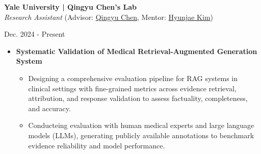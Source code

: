 \documentclass[10pt, letterpaper]{article}
\newenvironment{highlights}{
    \begin{itemize}[
        topsep=0.10 cm,
        parsep=0.10 cm,
        partopsep=0pt,
        itemsep=0pt,
        leftmargin=0 cm + 10pt
    ]
}{
    \end{itemize}
} %
\newenvironment{twocolentry}[2][]{
    \onecolentry
    \def\secondColumn{#2}
    \setcolumnwidth{\fill, 3.5 cm}
    \begin{paracol}{2}
}{
    \switchcolumn \raggedleft \secondColumn
    \end{paracol}
    \endonecolentry
} %
\begin{document}
\vspace{0.1 cm}
        \begin{twocolentry}{
            Dec. 2024 - Present\\ 
        }
        \textbf{Yale University | Qingyu Chen's Lab} \href{https://sites.google.com/view/qingyuchen/home/}{\faExternalLink*}\\
        \textit{Research Assistant} (Advisor: \href{https://scholar.google.com/citations?user=FSLotiMAAAAJ&hl=en}{Qingyu Chen}, Mentor: \href{https://scholar.google.co.kr/citations?user=rqBpumIAAAAJ&hl=ko}{Hyunjae Kim})
        
        \end{twocolentry}
    \vspace{0.1 cm}
\begin{highlights}
    \item \textbf{Systematic Validation of Medical Retrieval-Augmented Generation System}
    \vspace{-0.1 cm}
    \begin{highlights}
        \item Designing a comprehensive evaluation pipeline for RAG systems in clinical settings with fine-grained metrics across evidence retrieval, attribution, and response validation to assess factuality, completeness, and accuracy.
        \item Conducteing evaluation with human medical experts and  large language models (LLMs), generating publicly available annotations to benchmark evidence reliability and model performance.
    \end{highlights}

\end{highlights}
\end{document}
